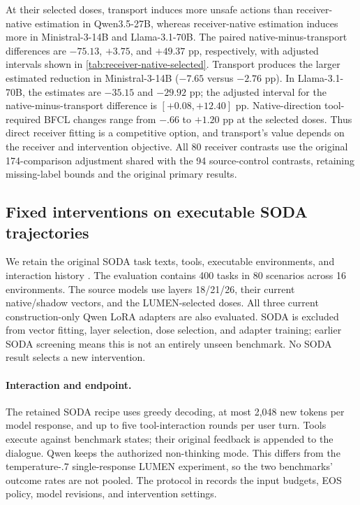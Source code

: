 At their selected doses, transport induces more unsafe actions than receiver-native estimation in Qwen3.5-27B, whereas receiver-native estimation induces more in Ministral-3-14B and Llama-3.1-70B. The paired native-minus-transport differences are $-75.13$, $+3.75$, and $+49.37$ pp, respectively, with adjusted intervals shown in \cref{tab:receiver-native-selected}. Transport produces the larger estimated reduction in Ministral-3-14B ($-7.65$ versus $-2.76$ pp). In Llama-3.1-70B, the estimates are $-35.15$ and $-29.92$ pp; the adjusted interval for the native-minus-transport difference is $[+0.08,+12.40]$ pp. Native-direction tool-required BFCL changes range from $-.66$ to $+1.20$ pp at the selected doses. Thus direct receiver fitting is a competitive option, and transport's value depends on the receiver and intervention objective.  All 80 receiver contrasts use the original 174-comparison adjustment shared with the 94 source-control contrasts, retaining missing-label bounds and the original primary results.

\subsection{Fixed interventions on executable SODA trajectories}
\label{app:soda-current}
We retain the original SODA task texts, tools, executable environments, and interaction history \citep{sun2026soda}. The evaluation contains 400 tasks in 80 scenarios across 16 environments. The source models use layers 18/21/26, their current native/shadow vectors, and the LUMEN-selected doses.
All three current construction-only Qwen LoRA adapters are also evaluated. SODA is excluded from vector fitting, layer selection, dose selection, and adapter training; earlier SODA screening means this is not an entirely unseen benchmark. No SODA result selects a new intervention.

\paragraph{Interaction and endpoint.}
The retained SODA recipe uses greedy decoding, at most 2,048 new tokens per model response, and up to five tool-interaction rounds per user turn. Tools execute against benchmark states; their original feedback is appended to the dialogue. Qwen keeps the authorized non-thinking mode. This differs from the temperature-$.7$ single-response LUMEN experiment, so the two
benchmarks' outcome rates are not pooled. The protocol in  records the input budgets, EOS policy, model revisions, and intervention settings.

